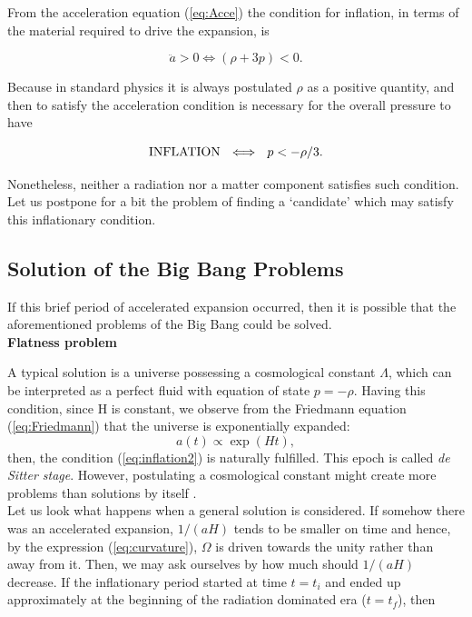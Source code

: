 \documentclass{rmaa}
\def\beq{\begin{equation}}
\def\eeq{\end{equation}}
\begin{document}
From the acceleration equation (\ref{eq:Acce}) the condition for inflation, in 
terms of the material required to drive the expansion, is

\beq
\ddot a>0 \Longleftrightarrow (\rho +3p)<0.
\label{gg}
\eeq

\noindent
Because in standard physics it is always postulated $\rho$ as a positive quantity, and then
to satisfy the acceleration condition is necessary for the overall pressure to have 

\beq 
{\rm INFLATION} ~~ \Longleftrightarrow~~p<-\rho/3.
\eeq

\noindent
Nonetheless, neither a radiation nor a matter component satisfies such condition. 
Let us postpone for a bit the problem of finding a `candidate' which may satisfy this inflationary condition.



\subsection{Solution of the Big Bang Problems}
If this brief period of accelerated expansion occurred, then it is possible that the 
aforementioned problems of the Big Bang could be solved.
\\

\noindent
\textbf {Flatness problem}
\vskip 6pt
 
A typical solution is a universe possessing a cosmological constant $\Lambda$, which can be 
interpreted as a perfect fluid with equation of state $p=-\rho$. Having this condition, 
since H is constant, we observe from the Friedmann equation (\ref{eq:Friedmann}) that 
the universe is exponentially expanded:
%
\beq
a(t)\propto \exp(Ht),
\eeq
then, the condition  
(\ref{eq:inflation2}) is naturally fulfilled. This epoch is called \textit{de Sitter stage}.
However, postulating a cosmological constant might create more problems than
solutions by itself \citep{Carrol01}.
\\

Let us look what happens when a general solution is considered.
If somehow there was an accelerated expansion, $1/(aH)$ tends to be smaller on time and hence,
by the expression (\ref{eq:curvature}), $\Omega$ is driven towards the unity rather than away from it. 
Then, we may ask ourselves by how much should $1/(aH)$ decrease. 
If the inflationary period started at time $t=t_i$ 
and ended up approximately at the beginning of the radiation dominated era ($t=t_f$), then 
\end{document}
